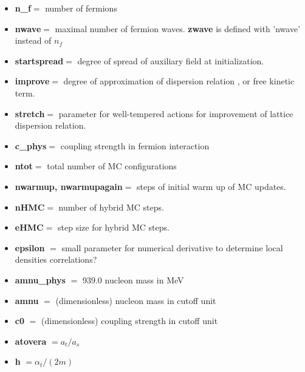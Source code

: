 \documentclass[10pt]{book}
\begin{document}
\begin{itemize}
	\item {\bf n\_f}$=$ number of fermions
	\item {\bf nwave}$=$ maximal number of fermion waves. {\bf zwave} is defined with 'nwave'
	      instead of $n_f$
	\item {\bf startspread}$=$ degree of spread of auxiliary field at initialization.
	\item {\bf improve}$=$ degree of approximation of dispersion relation , or free kinetic term. 
	\item {\bf stretch}$=$ parameter for well-tempered actions for improvement of lattice dispersion
	      relation.
	\item {\bf c\_phys}$=$ coupling strength in fermion interaction
	\item {\bf ntot}$=$ total number of MC configurations
	\item {\bf nwarmup, nwarmupagain}$=$ steps of initial warm up of MC updates. 
	\item {\bf nHMC}$=$ number of hybrid MC steps.
	\item {\bf eHMC}$=$ step size for hybrid MC steps.
	\item {\bf epsilon} $=$ small parameter for numerical derivative to determine local densities correlations?
	\item {\bf amnu\_phys} $=$ 939.0 nucleon mass in MeV
	\item {\bf amnu} $=$ (dimensionless) nucleon mass in cutoff unit
	\item {\bf c0} $=$ (dimensionless) coupling strength in cutoff unit
	\item {\bf atovera} $= a_t/a_s$
	\item {\bf h} $= \alpha_t/(2 m)$  
\end{itemize}
\end{document}
